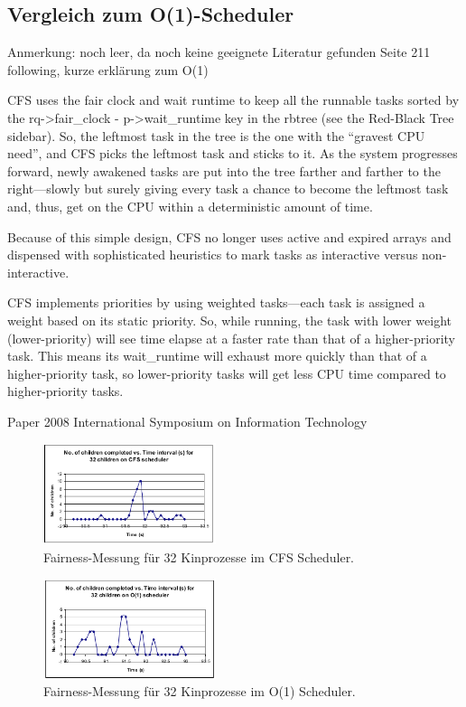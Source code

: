\subsection{Vergleich zum O(1)-Scheduler}\label{s:compO1}
Anmerkung: noch leer, da noch keine geeignete Literatur gefunden
 \cite{asilberschatz}  Seite 211 following, kurze erklärung zum O(1)
 
  CFS uses the fair clock and wait runtime to keep all the runnable tasks sorted by the rq->fair\_clock - p->wait\_runtime key in the rbtree (see the Red-Black Tree sidebar). So, the leftmost task in the tree is the one with the “gravest CPU need”, and CFS picks the leftmost task and sticks to it. As the system progresses forward, newly awakened tasks are put into the tree farther and farther to the right—slowly but surely giving every task a chance to become the leftmost task and, thus, get on the CPU within a deterministic amount of time.
 
 Because of this simple design, CFS no longer uses active and expired arrays and dispensed with sophisticated heuristics to mark tasks as interactive versus non-interactive.
 
 CFS implements priorities by using weighted tasks—each task is assigned a weight based on its static priority. So, while running, the task with lower weight (lower-priority) will see time elapse at a faster rate than that of a higher-priority task. This means its wait\_runtime will exhaust more quickly than that of a higher-priority task, so lower-priority tasks will get less CPU time compared to higher-priority tasks. 
 \cite{cpabla}
 
 
 Paper 2008 International Symposium on Information Technology
 \cite{papercomparison}
 
\begin{figure}[h]
	\centering
	\includegraphics[width=0.45\textwidth]{pictures/fairness_32_cfs.png}
	\caption{Fairness-Messung für 32 Kinprozesse im CFS Scheduler.}
	\label{fig:fair_meas_cfs}
\end{figure}
\begin{figure}[h]
 	\centering
 	\includegraphics[width=0.45\textwidth]{pictures/fairness_32_O1.png}
 	\caption{Fairness-Messung für 32 Kinprozesse im O(1) Scheduler.}
 	\label{fig:fair_meas_o1}
\end{figure}
 
